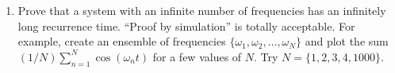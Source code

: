 
\begin{enumerate}
  \item Prove that a system with an infinite number of frequencies has an infinitely long recurrence time. ``Proof by simulation'' is totally acceptable. For example, create an ensemble of frequencies $\{\omega_1, \omega_2,\ldots,\omega_N\}$ and plot the sum $(1/N) \sum_{n=1}^N \cos(\omega_n t)$ for a few values of $N$. Try $N=\{1, 2, 3, 4, 1000\}$.
\end{enumerate}
